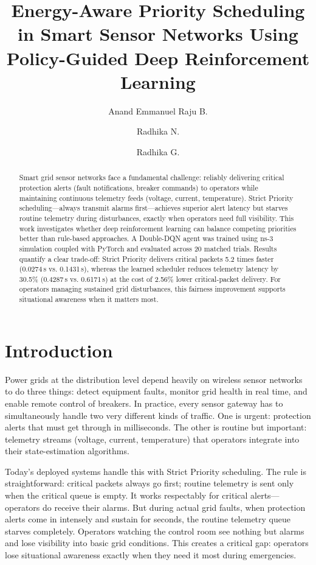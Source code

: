 \documentclass[runningheads,a4paper]{llncs}
\title{Energy-Aware Priority Scheduling in Smart Sensor Networks Using Policy-Guided Deep Reinforcement Learning}
\author{Anand Emmanuel Raju B.\inst{1} \and Radhika N.\inst{1} \and Radhika G.\inst{1}}
\institute{
Department of Computer Science and Engineering,\\
Amrita School of Computing, Coimbatore,\\
Amrita Vishwa Vidyapeetham, India\\
\email{cb.sc.p2cse25003@cb.students.amrita.edu, n\_radhika@cb.amrita.edu, g\_radhika@cb.amrita.edu}
}
\begin{document}
\maketitle

\begin{abstract}
Smart grid sensor networks face a fundamental challenge: reliably delivering critical protection alerts (fault notifications, breaker commands) to operators while maintaining continuous telemetry feeds (voltage, current, temperature). Strict Priority scheduling---always transmit alarms first---achieves superior alert latency but starves routine telemetry during disturbances, exactly when operators need full visibility. This work investigates whether deep reinforcement learning can balance competing priorities better than rule-based approaches. A Double-DQN agent was trained using ns-3 simulation coupled with PyTorch and evaluated across 20 matched trials. Results quantify a clear trade-off: Strict Priority delivers critical packets 5.2 times faster (0.0274\,s vs. 0.1431\,s), whereas the learned scheduler reduces telemetry latency by 30.5\% (0.4287\,s vs. 0.6171\,s) at the cost of 2.56\% lower critical-packet delivery. For operators managing sustained grid disturbances, this fairness improvement supports situational awareness when it matters most.

\end{abstract}

\section{Introduction}
Power grids at the distribution level depend heavily on wireless sensor networks to do three things: detect equipment faults, monitor grid health in real time, and enable remote control of breakers. In practice, every sensor gateway has to simultaneously handle two very different kinds of traffic. One is urgent: protection alerts that must get through in milliseconds. The other is routine but important: telemetry streams (voltage, current, temperature) that operators integrate into their state-estimation algorithms.

Today's deployed systems handle this with Strict Priority scheduling. The rule is straightforward: critical packets always go first; routine telemetry is sent only when the critical queue is empty. It works respectably for critical alerts---operators do receive their alarms. But during actual grid faults, when protection alerts come in intensely and sustain for seconds, the routine telemetry queue starves completely. Operators watching the control room see nothing but alarms and lose visibility into basic grid conditions. This creates a critical gap: operators lose situational awareness exactly when they need it most during emergencies.
\end{document}
